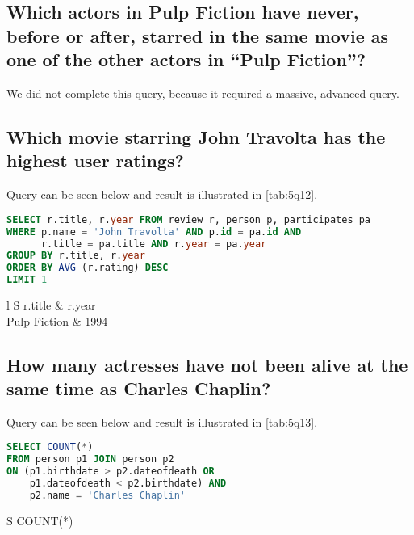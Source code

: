 \subsection{Which actors in Pulp Fiction have never, before or after, starred in the same movie as one of the other actors in “Pulp Fiction”?}
We did not complete this query, because it required a massive, advanced query.

\subsection{Which movie starring John Travolta has the highest user ratings?}
Query can be seen below and result is illustrated in \cref{tab:5q12}.

\begin{lstlisting}[language=SQL]
SELECT r.title, r.year FROM review r, person p, participates pa 
WHERE p.name = 'John Travolta' AND p.id = pa.id AND
      r.title = pa.title AND r.year = pa.year
GROUP BY r.title, r.year
ORDER BY AVG (r.rating) DESC
LIMIT 1
\end{lstlisting}

\begin{table}
  \centering
  \begin{tabular}[htpb]{l S}
    \toprule
    r.title & {r.year} \\
    \midrule
    Pulp Fiction & 1994 \\
    \bottomrule
  \end{tabular}
  \caption{Results of query 12}\label{tab:5q12}
\end{table}

\subsection{How many actresses have not been alive at the same time as Charles Chaplin?}
Query can be seen below and result is illustrated in \cref{tab:5q13}.

\begin{lstlisting}[language=SQL]
SELECT COUNT(*)
FROM person p1 JOIN person p2
ON (p1.birthdate > p2.dateofdeath OR
    p1.dateofdeath < p2.birthdate) AND
    p2.name = 'Charles Chaplin'
\end{lstlisting}
%
\begin{table}
  \centering
  \begin{tabular}[htpb]{S}
    \toprule
    {COUNT(*)} \\
     \\
    \bottomrule
  \end{tabular}
  \caption{Results of query 13}\label{tab:5q13}
\end{table}

